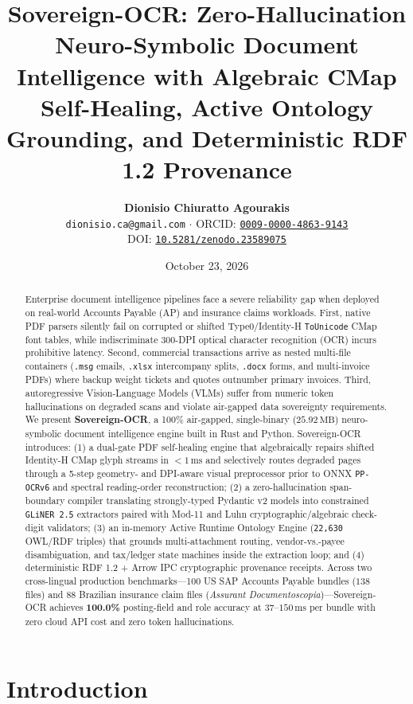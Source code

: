 \documentclass[10pt,twocolumn,letterpaper]{article}
\title{\vspace{-1.2em}\textbf{\Large\color{navy} Sovereign-OCR: Zero-Hallucination Neuro-Symbolic Document Intelligence with Algebraic CMap Self-Healing, Active Ontology Grounding, and Deterministic RDF 1.2 Provenance}\vspace{0.3em}}
\author{
  \textbf{Dionisio Chiuratto Agourakis} \\[0.25em]
  \small \texttt{dionisio.ca@gmail.com} \quad $\cdot$ \quad ORCID: \href{https://orcid.org/0009-0000-4863-9143}{\texttt{0009-0000-4863-9143}} \\[0.15em]
  \small DOI: \href{https://doi.org/10.5281/zenodo.23589075}{\texttt{10.5281/zenodo.23589075}}
}
\date{\small October 23, 2026}
\begin{document}
\maketitle

\begin{abstract}
\noindent
Enterprise document intelligence pipelines face a severe reliability gap when deployed on real-world Accounts Payable (AP) and insurance claims workloads. First, native PDF parsers silently fail on corrupted or shifted Type0/Identity-H \texttt{ToUnicode} CMap font tables, while indiscriminate 300-DPI optical character recognition (OCR) incurs prohibitive latency. Second, commercial transactions arrive as nested multi-file containers (\texttt{.msg} emails, \texttt{.xlsx} intercompany splits, \texttt{.docx} forms, and multi-invoice PDFs) where backup weight tickets and quotes outnumber primary invoices. Third, autoregressive Vision-Language Models (VLMs) suffer from numeric token hallucinations on degraded scans and violate air-gapped data sovereignty requirements. We present \textbf{Sovereign-OCR}, a 100\% air-gapped, single-binary ($25.92\,\text{MB}$) neuro-symbolic document intelligence engine built in Rust and Python. Sovereign-OCR introduces: (1) a dual-gate PDF self-healing engine that algebraically repairs shifted Identity-H CMap glyph streams in $<1\,\text{ms}$ and selectively routes degraded pages through a 5-step geometry- and DPI-aware visual preprocessor prior to ONNX \texttt{PP-OCRv6} and spectral reading-order reconstruction; (2) a zero-hallucination span-boundary compiler translating strongly-typed Pydantic v2 models into constrained \texttt{GLiNER 2.5} extractors paired with Mod-11 and Luhn cryptographic/algebraic check-digit validators; (3) an in-memory Active Runtime Ontology Engine (\texttt{22,630} OWL/RDF triples) that grounds multi-attachment routing, vendor-vs.-payee disambiguation, and tax/ledger state machines inside the extraction loop; and (4) deterministic RDF 1.2 + Arrow IPC cryptographic provenance receipts. Across two cross-lingual production benchmarks---100 US SAP Accounts Payable bundles ($138$ files) and 88 Brazilian insurance claim files (\emph{Assurant Documentoscopia})---Sovereign-OCR achieves \textbf{100.0\%} posting-field and role accuracy at $37\text{--}150\,\text{ms}$ per bundle with zero cloud API cost and zero token hallucinations.
\end{abstract}

\section{Introduction}
\end{document}
